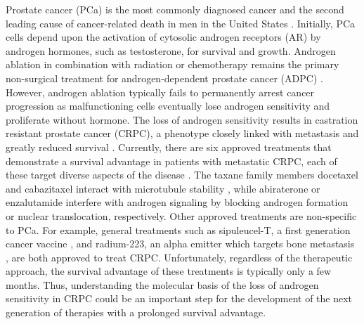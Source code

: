 \documentclass[12pt]{article}
\begin{document}
Prostate cancer (PCa) is the most commonly diagnosed cancer and the second leading cause of cancer-related death in men in the United States \cite{Siegel2013}. 
Initially, PCa cells depend upon the activation of cytosolic androgen receptors (AR) by androgen hormones, such as testosterone, for survival and growth. 
Androgen ablation in combination with radiation or chemotherapy remains the primary non-surgical treatment for androgen-dependent prostate cancer (ADPC) \cite{Huggins1967}. 
However, androgen ablation typically fails to permanently arrest cancer progression as malfunctioning cells eventually lose androgen sensitivity and proliferate without hormone. 
The loss of androgen sensitivity results in castration resistant prostate cancer (CRPC), a phenotype closely linked with metastasis and greatly reduced survival \cite{Harris2009}.
Currently, there are six approved treatments that demonstrate a survival advantage in patients with metastatic CRPC, each of these target diverse aspects of the disease \cite{Sartor2013}.
The taxane family members docetaxel and cabazitaxel interact with microtubule stability \cite{Tannock2004,Bono2010}, while abiraterone \cite{Sartor2013} or enzalutamide \cite{Scher2012} interfere with androgen signaling by blocking androgen formation or nuclear translocation, respectively.
Other approved treatments are non-specific to PCa. 
For example, general treatments such as sipuleucel-T, a first generation cancer vaccine \cite{Kantoff2010}, 
and radium-223, an alpha emitter which targets bone metastasis \cite{Parker2013}, are both approved to treat CRPC.
Unfortunately, regardless of the therapeutic approach, the survival advantage of these treatments is typically only a few months. 
Thus, understanding the molecular basis of the loss of androgen sensitivity in CRPC could be an important step for the development of the next generation of therapies with a prolonged survival
advantage.   
\end{document}
